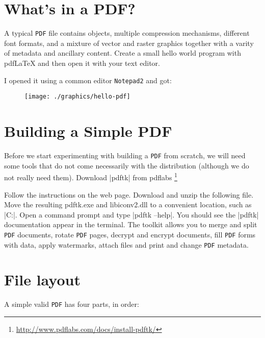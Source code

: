 \restoregeometry

\def\pdf{\texttt{PDF}\xspace}
\let\PDF\pdf

\section{What's in a PDF?}

A typical \PDF file contains objects, multiple compression mechanisms, different font formats, and a mixture of vector and raster graphics together with a varity of metadata and ancillary content. Create a small hello world program with pdfLaTeX and then open it with your text editor.


I opened it using a common editor \texttt{Notepad2} and got:

\begin{figure}[htbp]
\texttt{[image: ./graphics/hello-pdf]}
\end{figure}


\section{Building a Simple PDF}

Before we start experimenting with building a \pdf from scratch, we will need some tools that do not come necessarily with the \tex distribution (although we do not really need them). Download |pdftk| from pdflabs
\footnote{\protect\url{http://www.pdflabs.com/docs/install-pdftk/}}

Follow the instructions on the web page. Download and unzip the following file. Move the resulting pdftk.exe and libiconv2.dll to a convenient location, such as  |C:\windows{}|. Open a command prompt and type |pdftk --help|. You should see the |pdftk| documentation appear in the terminal.  The toolkit allows you to merge and split \pdf documents, rotate \pdf pages, decrypt and encrypt documents, fill \pdf forms with data, apply watermarks, attach files and print and change \pdf metadata.

\section{File layout}

A simple valid \pdf has four parts, in order:

